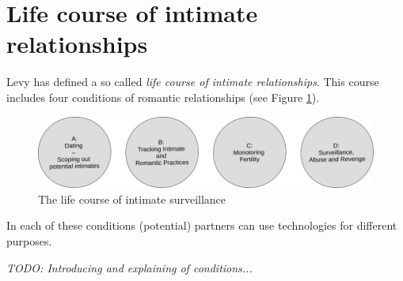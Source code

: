 \section{Life course of intimate relationships}

Levy \cite{levy2014intimate} has defined a so called \textit{life course of intimate relationships}. This course includes four conditions of romantic relationships (see Figure \ref{fig:live_course}).
\begin{figure}[htb]
    \centering
	\includegraphics[width=\linewidth]{img/life_course_of_intimate_surveillance.png}
	\caption{The life course of intimate surveillance}
	\label{fig:live_course}
\end{figure}

In each of these conditions (potential) partners can use technologies for different purposes.

\textit{TODO: Introducing and explaining of conditions...}
